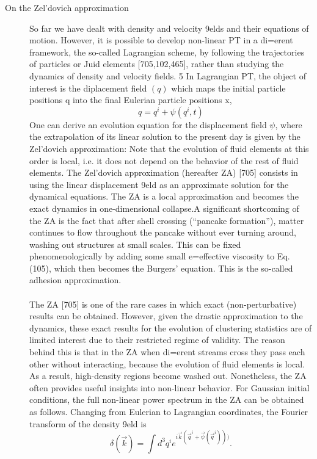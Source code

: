 \begin{description}
\item[On the Zel'dovich approximation] 
 So far we have dealt with density and velocity 9elds and their equations of motion. However,
it is possible to develop non-linear PT in a di=erent framework, the so-called Lagrangian scheme,
by following the trajectories of particles or Juid elements [705,102,465], rather than studying the 
dynamics of density and velocity fields. 5 In Lagrangian PT, the object of interest is the diplacement field $(q)$ which maps the initial particle positions q into the final Eulerian particle
positions x,
\[q = q^i + \psi(q^i,t)\]
One can derive an evolution equation for the displacement field $\psi$, where the extrapolation of its linear solution to the present day is given by the Zel'dovich approximation:
Note that the evolution of fluid elements at this order is
local, i.e. it does not depend on the behavior of the rest of fluid elements. The Zel’dovich approximation (hereafter ZA) [705] consists in using the linear displacement 9eld
as an approximate solution for the dynamical equations. The ZA is a local approximation and becomes
the exact dynamics in one-dimensional collapse.A significant shortcoming of the ZA is the fact that after shell crossing (“pancake formation”),
matter continues to flow throughout the pancake without ever turning around, washing out structures
at small scales. This can be fixed phenomenologically by adding some small e=effective viscosity to
Eq. (105), which then becomes the Burgers’ equation. This is the so-called adhesion approximation.\\
\\ 
The ZA [705] is one of the rare cases in which exact (non-perturbative) results can be obtained.
However, given the drastic approximation to the dynamics, these exact results for the evolution
of clustering statistics are of limited interest due to their restricted regime of validity. The reason
behind this is that in the ZA when di=erent streams cross they pass each other without interacting,
because the evolution of fluid elements is local. As a result, high-density regions become washed
out. Nonetheless, the ZA often provides useful insights into non-linear behavior.
For Gaussian initial conditions, the full non-linear power spectrum in the ZA can be obtained
as follows. Changing
from Eulerian to Lagrangian coordinates, the Fourier
transform of the density 9eld is
\begin{equation*}
\delta(\vec{k}) = \int d^3q^i e^{i\vec{k}(\vec{q}^i+\vec{\psi}(\vec{q}^i)))} .
\end{equation*}

\end{description}
